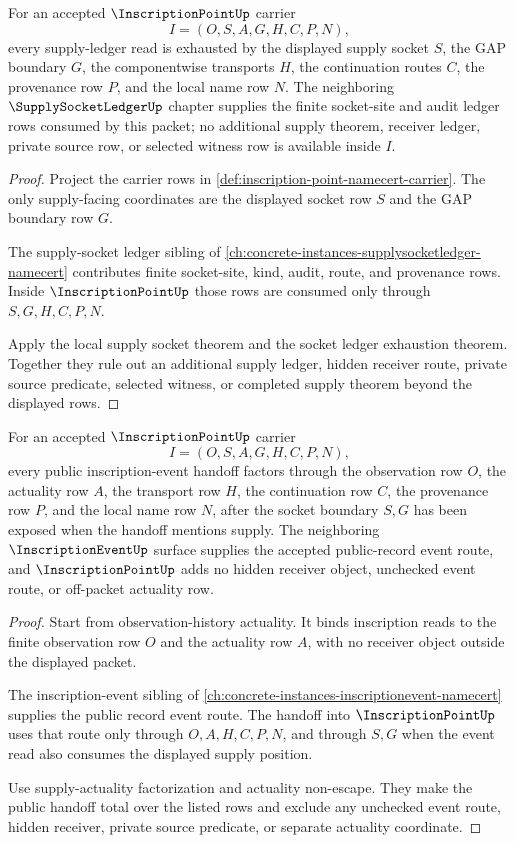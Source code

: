 \begin{theorem}
\label{thm:inscription-point-supply-ledger-row-exhaustion}
For an accepted $\InscriptionPointUp$ carrier
$$
I=(O,S,A,G,H,C,P,N),
$$
every supply-ledger read is exhausted by the displayed supply socket $S$, the GAP boundary $G$, the componentwise transports $H$, the continuation routes $C$, the provenance row $P$, and the local name row $N$. The neighboring $\SupplySocketLedgerUp$ chapter supplies the finite socket-site and audit ledger rows consumed by this packet; no additional supply theorem, receiver ledger, private source row, or selected witness row is available inside $I$.
\end{theorem}
\begin{proof}
Project the carrier rows in \autoref{def:inscription-point-namecert-carrier}. The only supply-facing coordinates are the displayed socket row $S$ and the GAP boundary row $G$.

The supply-socket ledger sibling of \autoref{ch:concrete-instances-supplysocketledger-namecert} contributes finite socket-site, kind, audit, route, and provenance rows. Inside $\InscriptionPointUp$ those rows are consumed only through $S,G,H,C,P,N$.

Apply the local supply socket theorem and the socket ledger exhaustion theorem. Together they rule out an additional supply ledger, hidden receiver route, private source predicate, selected witness, or completed supply theorem beyond the displayed rows.
\end{proof}

\begin{theorem}
\label{thm:inscription-point-inscription-event-handoff-totality}
For an accepted $\InscriptionPointUp$ carrier
$$
I=(O,S,A,G,H,C,P,N),
$$
every public inscription-event handoff factors through the observation row $O$, the actuality row $A$, the transport row $H$, the continuation row $C$, the provenance row $P$, and the local name row $N$, after the socket boundary $S,G$ has been exposed when the handoff mentions supply. The neighboring $\InscriptionEventUp$ surface supplies the accepted public-record event route, and $\InscriptionPointUp$ adds no hidden receiver object, unchecked event route, or off-packet actuality row.
\end{theorem}
\begin{proof}
Start from observation-history actuality. It binds inscription reads to the finite observation row $O$ and the actuality row $A$, with no receiver object outside the displayed packet.

The inscription-event sibling of \autoref{ch:concrete-instances-inscriptionevent-namecert} supplies the public record event route. The handoff into $\InscriptionPointUp$ uses that route only through $O,A,H,C,P,N$, and through $S,G$ when the event read also consumes the displayed supply position.

Use supply-actuality factorization and actuality non-escape. They make the public handoff total over the listed rows and exclude any unchecked event route, hidden receiver, private source predicate, or separate actuality coordinate.
\end{proof}

